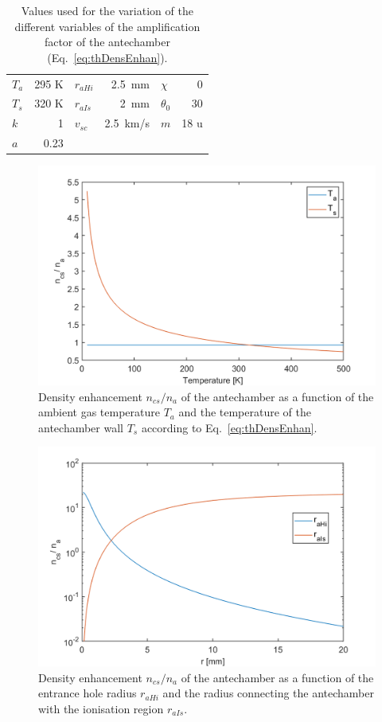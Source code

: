 	\begin{table}[H]
		\begin{center}
			\begin{tabular}{|l r |l r |l r|}
				\hline
				$T_a$ 	& 295 K	& $r_{aHi}$	& 2.5~mm	& $\chi$	& 0\degree \\
				$T_s$ 	& 320 K & $r_{aIs}$ & 2~mm	& $\theta_0$& 30\degree\\	
				$k$		&	1	& $v_{sc}$	& 2.5~km/s& $m$		& 18 u\\
				$a$		& 0.23	&			&			&			&	\\
				\hline
			\end{tabular}
		\end{center}
		\caption{Values used for the variation of the different variables of the amplification factor of the antechamber (Eq.~\eqref{eq:thDensEnhan}).}
		\label{tab:thDensEnhan}
	\end{table}
	\begin{figure}[h!] %
		\centering
		\includegraphics[width= .7\textwidth]{Bilder/Ta_Ts.png}
		\caption{Density enhancement $n_{cs}/n_a$ of the antechamber as a function of the ambient gas temperature $T_a$ and the temperature of the antechamber wall $T_s$ according to Eq.~\eqref{eq:thDensEnhan}.}
		\label{th:densEnhTaTs}
	\end{figure}
	\begin{figure}[h!] %
		\centering
		\includegraphics[width= .7\textwidth]{Bilder/raHi_raIs.png}
		\caption{Density enhancement $n_{cs}/n_a$ of the antechamber as a function of the entrance hole radius $r_{aHi}$ and the radius connecting the antechamber with the ionisation region $r_{aIs}$.}
		\label{th:densEnhraHiraIs}
	\end{figure}
